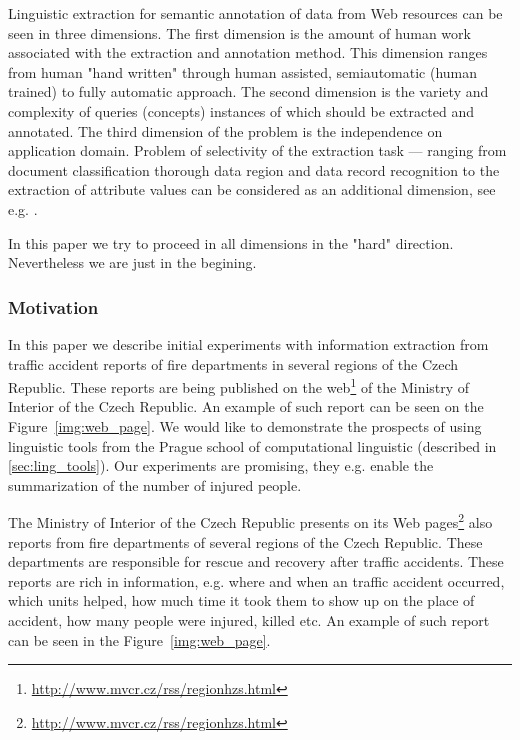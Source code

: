Linguistic extraction for semantic annotation of data from Web resources can be seen in three dimensions. The first dimension is the amount of human work associated with the extraction and annotation method. This dimension ranges from human "hand written"  through human assisted, semiautomatic (human trained) to fully automatic approach. The second dimension is the variety and complexity of queries (concepts) instances of which should be extracted and annotated. The third dimension of the problem is the independence on application domain. Problem of selectivity of the extraction task --- ranging from document classification thorough data region and data record recognition to the extraction of attribute values can be considered as an additional dimension, see e.g.  \cite{biblio:Survey_of_Web_Information_Extraction_Systems}. 

In this paper we try to proceed in all dimensions in the "hard" direction. Nevertheless we are just in the begining.

\subsubsection{Motivation}



In this paper we describe initial experiments with information extraction from traffic accident reports of fire departments in several regions of the Czech Republic. These reports are being published on the web\footnote{\url{http://www.mvcr.cz/rss/regionhzs.html}} of the Ministry of Interior of the Czech Republic. An example of such report can be seen on the Figure~\ref{img:web_page}. We would like to demonstrate the prospects of using linguistic tools from the Prague school of computational linguistic (described in \ref{sec:ling_tools}). Our experiments are promising, they e.g. enable the summarization of the number of injured people. 

The Ministry of Interior of the Czech Republic presents on its Web pages\footnote{\url{http://www.mvcr.cz/rss/regionhzs.html}} also reports from fire departments of several regions of the Czech Republic. These departments are responsible for rescue and recovery after traffic accidents. These reports are rich in information, e.g. where and when an traffic accident occurred, which units helped, how much time it took them to show up on the place of accident, how many people were injured, killed etc. An example of such report can be seen in the Figure~\ref{img:web_page}.






